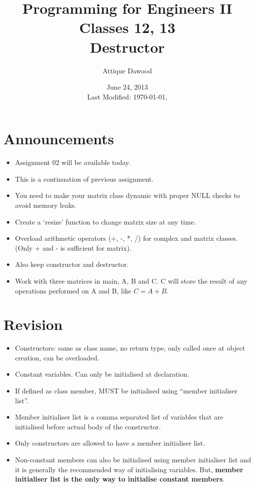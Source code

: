 \documentclass[12pt,a4paper]{article}
\title{\vspace{-2cm}Programming for Engineers II\\Classes 12, 13\\Destructor}
\author{Attique Dawood}
\date{June 24, 2013\\[0.2cm] Last Modified: \today, \currenttime}
\begin{document}
\maketitle
\section{Announcements}
\begin{itemize}
\item Assignment 02 will be available today.
\item This is a continuation of previous assignment.
\item You need to make your matrix class dynamic with proper NULL checks to avoid memory leaks.
\item Create a `resize' function to change matrix size at any time.
\item Overload arithmetic operators (+, -, *, /) for complex and matrix classes. (Only + and - is sufficient for matrix).
\item Also keep constructor and destructor.
\item Work with three matrices in main, A, B and C. C will store the result of any operations performed on A and B, like $C = A + B$.
\end{itemize}
\section{Revision}
\begin{itemize}
\item Constructors: same as class name, no return type, only called once at object creation, can be overloaded.
\item Constant variables. Can only be initialised at declaration.
\item If defined as class member, MUST be initialised using ``member initialiser list''.
\item Member initialiser list is a comma separated list of variables that are initialised before actual body of the constructor.
\item Only constructors are allowed to have a member initialiser list.
\item Non-constant members can also  be initialised using member initialiser list and it is generally the recommended way of initialising variables. But, \textbf{member initialiser list is the only way to initialise constant members}.
\end{itemize}
\end{document}
